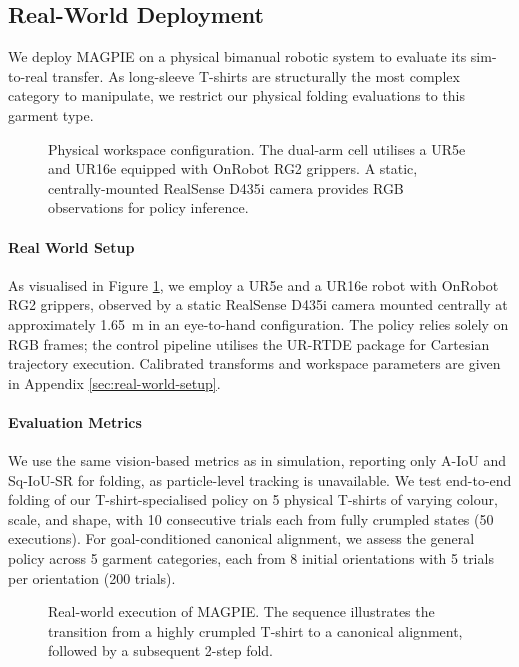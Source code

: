 \documentclass[journal]{IEEEtran}
\begin{document}
\subsection{Real-World Deployment}
\label{sec:exp_real_world}

We deploy MAGPIE on a physical bimanual robotic system to evaluate its sim-to-real transfer. As long-sleeve T-shirts are structurally the most complex category to manipulate, we restrict our physical folding evaluations to this garment type.

\begin{figure}[!h]
    \centering
    \caption{Physical workspace configuration. The dual-arm cell utilises a UR5e and UR16e equipped with OnRobot RG2 grippers. A static, centrally-mounted RealSense D435i camera provides RGB observations for policy inference.}
    \label{fig:real_world_setup}
\end{figure}

\paragraph{Real World Setup} 
As visualised in Figure \ref{fig:real_world_setup}, we employ a UR5e and a UR16e robot with OnRobot RG2 grippers, observed by a static RealSense D435i camera mounted centrally at approximately 1.65~m in an eye-to-hand configuration. The policy relies solely on RGB frames; the control pipeline utilises the UR-RTDE package \cite{urrtde2025} for Cartesian trajectory execution. Calibrated transforms and workspace parameters are given in Appendix \ref{sec:real-world-setup}.

\paragraph{Evaluation Metrics}
We use the same vision-based metrics as in simulation, reporting only A-IoU and Sq-IoU-SR for folding, as particle-level tracking is unavailable. We test end-to-end folding of our T-shirt-specialised policy on 5 physical T-shirts of varying colour, scale, and shape, with 10 consecutive trials each from fully crumpled states (50 executions). For goal-conditioned canonical alignment, we assess the general policy across 5 garment categories, each from 8 initial orientations with 5 trials per orientation (200 trials).

\begin{figure}[!h]
    \centering
    \caption{Real-world execution of MAGPIE. The sequence illustrates the transition from a highly crumpled T-shirt to a canonical alignment, followed by a subsequent 2-step fold.}
    \label{fig:real_world}
\end{figure}
\end{document}
